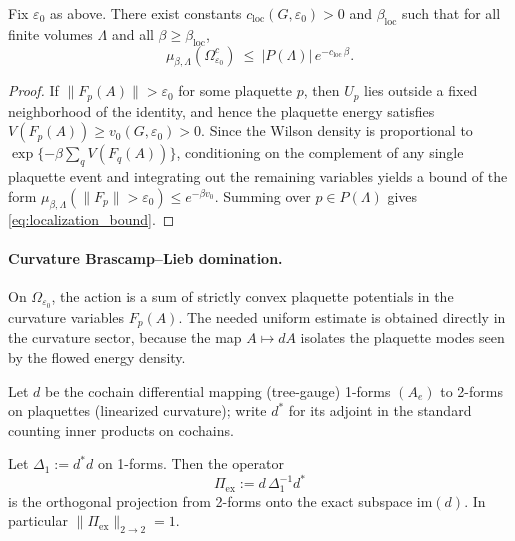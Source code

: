 \begin{lemma}\label{lem:weak_localization}
Fix $\varepsilon_0$ as above. There exist constants $c_\mathrm{loc}(G,\varepsilon_0)>0$ and $\beta_\mathrm{loc}$ such that
for all finite volumes $\Lambda$ and all $\beta\ge\beta_\mathrm{loc}$,
\begin{equation}\label{eq:localization_bound}
\mu_{\beta,\Lambda}(\Omega_{\varepsilon_0}^c)\ \le\ |P(\Lambda)|\,e^{-c_\mathrm{loc}\,\beta}.
\end{equation}
\end{lemma}

\begin{proof}
If $\|F_p(A)\|>\varepsilon_0$ for some plaquette $p$, then $U_p$ lies outside a fixed neighborhood of the identity,
and hence the plaquette energy satisfies $V(F_p(A))\ge v_0(G,\varepsilon_0)>0$.
Since the Wilson density is proportional to $\exp\{-\beta\sum_{q}V(F_q(A))\}$, conditioning on the complement of any single plaquette event
and integrating out the remaining variables yields a bound of the form
$\mu_{\beta,\Lambda}(\|F_p\|>\varepsilon_0)\le e^{-\beta v_0}$.
Summing over $p\in P(\Lambda)$ gives \eqref{eq:localization_bound}.
\end{proof}

\paragraph{Curvature Brascamp--Lieb domination.}
On $\Omega_{\varepsilon_0}$, the action is a sum of strictly convex plaquette potentials in the curvature variables $F_p(A)$.
The needed uniform estimate is obtained directly in the curvature sector, because the map $A\mapsto dA$ isolates the plaquette modes seen by the flowed energy density.

Let $d$ be the cochain differential mapping (tree-gauge) 1-forms $(A_e)$ to 2-forms on plaquettes (linearized curvature);
write $d^*$ for its adjoint in the standard counting inner products on cochains.

\begin{lemma}\label{lem:projection_identity}
Let $\Delta_1:=d^*d$ on 1-forms. Then the operator
\begin{equation}\label{eq:proj_exact}
\Pi_{\mathrm{ex}}:=d\,\Delta_1^{-1}d^*
\end{equation}
is the orthogonal projection from 2-forms onto the exact subspace $\mathrm{im}(d)$.
In particular $\|\Pi_{\mathrm{ex}}\|_{2\to 2}=1$.
\end{lemma}

